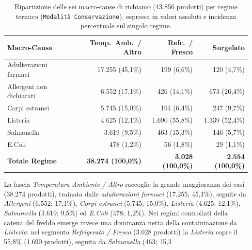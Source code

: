 \begin{table}[htbp]
\centering
\caption{Ripartizione delle sei macro-cause di richiamo (43.856 prodotti) per regime termico (\texttt{Modalità Conservazione}), espressa in valori assoluti e incidenza percentuale sul singolo regime.}
\label{tab:tableau_cold_chain}
\begin{tabularx}{\textwidth}{@{}Xrrr@{}}
\toprule
\textbf{Macro-Causa} & \textbf{Temp.\ Amb.\ / Altro} & \textbf{Refr.\ / Fresco} & \textbf{Surgelato} \\
\midrule
Adulterazioni farmaci & 17.255 (45,1\%) & 199 (6,6\%) & 120 (4,7\%) \\
Allergeni non dichiarati & 6.552 (17,1\%) & 426 (14,1\%) & 673 (26,4\%) \\
Corpi estranei & 5.745 (15,0\%) & 194 (6,4\%) & 247 (9,7\%) \\
Listeria & 4.625 (12,1\%) & 1.690 (55,8\%) & 1.339 (52,4\%) \\
Salmonella & 3.619 (9,5\%) & 463 (15,3\%) & 146 (5,7\%) \\
E.Coli & 478 (1,2\%) & 56 (1,8\%) & 29 (1,1\%) \\
\midrule
\textbf{Totale Regime} & \textbf{38.274 (100,0\%)} & \textbf{3.028 (100,0\%)} & \textbf{2.554 (100,0\%)} \\
\bottomrule
\end{tabularx}
\end{table}

La fascia \textit{Temperatura Ambiente / Altro} raccoglie la grande maggioranza dei casi (38.274 prodotti), trainata dalle \textit{adulterazioni farmaci} (17.255; 45,1\%), seguite da \textit{Allergeni} (6.552; 17,1\%), \textit{Corpi estranei} (5.745; 15,0\%), \textit{Listeria} (4.625; 12,1\%), \textit{Salmonella} (3.619; 9,5\%) ed \textit{E.Coli} (478; 1,2\%). Nei regimi controllati della catena del freddo emerge invece una dominanza netta della contaminazione da \textit{Listeria}: nel segmento \textit{Refrigerato / Fresco} (3.028 prodotti) la \textit{Listeria} copre il 55,8\% (1.690 prodotti), seguita da \textit{Salmonella} (463; 15,3%

